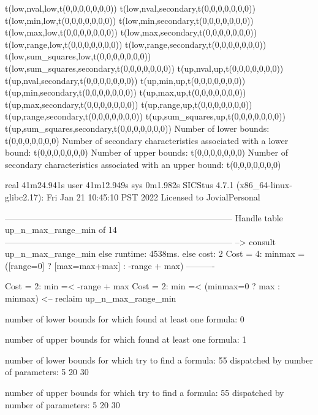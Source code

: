 t(low,nval,low,t(0,0,0,0,0,0,0))
t(low,nval,secondary,t(0,0,0,0,0,0,0))
t(low,min,low,t(0,0,0,0,0,0,0))
t(low,min,secondary,t(0,0,0,0,0,0,0))
t(low,max,low,t(0,0,0,0,0,0,0))
t(low,max,secondary,t(0,0,0,0,0,0,0))
t(low,range,low,t(0,0,0,0,0,0,0))
t(low,range,secondary,t(0,0,0,0,0,0,0))
t(low,sum_squares,low,t(0,0,0,0,0,0,0))
t(low,sum_squares,secondary,t(0,0,0,0,0,0,0))
t(up,nval,up,t(0,0,0,0,0,0,0))
t(up,nval,secondary,t(0,0,0,0,0,0,0))
t(up,min,up,t(0,0,0,0,0,0,0))
t(up,min,secondary,t(0,0,0,0,0,0,0))
t(up,max,up,t(0,0,0,0,0,0,0))
t(up,max,secondary,t(0,0,0,0,0,0,0))
t(up,range,up,t(0,0,0,0,0,0,0))
t(up,range,secondary,t(0,0,0,0,0,0,0))
t(up,sum_squares,up,t(0,0,0,0,0,0,0))
t(up,sum_squares,secondary,t(0,0,0,0,0,0,0))
Number of lower bounds:                                             t(0,0,0,0,0,0,0)
Number of secondary characteristics associated with a lower bound:  t(0,0,0,0,0,0,0)
Number of upper bounds:                                             t(0,0,0,0,0,0,0)
Number of secondary characteristics associated with an upper bound: t(0,0,0,0,0,0,0)

real	41m24.941s
user	41m12.949s
sys	0m1.982s
SICStus 4.7.1 (x86_64-linux-glibc2.17): Fri Jan 21 10:45:10 PST 2022
Licensed to JovialPersonal


--------------------------------------------------------------------------------
Handle table up_n_max_range_min of 14
--------------------------------------------------------------------------------
--> consult up_n_max_range_min
else runtime: 4538ms. else cost: 2
Cost =  4:  minmax = ([range=0] ? [max=max+max] : -range + max) %
----------

Cost =  2:  min =< -range + max
Cost =  2:  min =< (minmax=0 ? max : minmax)
<-- reclaim up_n_max_range_min

number of lower bounds for which found at least one formula: 0

number of upper bounds for which found at least one formula: 1

number of lower bounds for which try to find a formula: 55
dispatched by number of parameters: 5  20  30

number of upper bounds for which try to find a formula: 55
dispatched by number of parameters: 5  20  30

